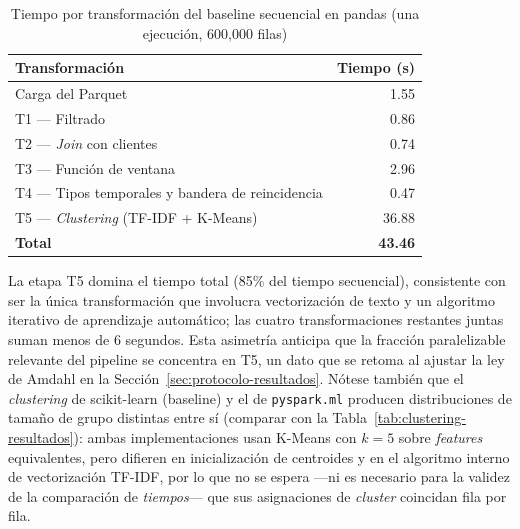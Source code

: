 \begin{table}[H]
\centering
\caption{Tiempo por transformación del baseline secuencial en pandas (una ejecución, 600{,}000 filas)}
\label{tab:baseline-tiempos}
\begin{tabular}{@{}lr@{}}
\toprule
\textbf{Transformación} & \textbf{Tiempo (s)} \\
\midrule
Carga del Parquet & 1.55 \\
T1 — Filtrado & 0.86 \\
T2 — \emph{Join} con clientes & 0.74 \\
T3 — Función de ventana & 2.96 \\
T4 — Tipos temporales y bandera de reincidencia & 0.47 \\
T5 — \emph{Clustering} (TF-IDF + K-Means) & 36.88 \\
\midrule
\textbf{Total} & \textbf{43.46} \\
\bottomrule
\end{tabular}
\end{table}

La etapa T5 domina el tiempo total (85\% del tiempo secuencial), consistente con ser la única
transformación que involucra vectorización de texto y un algoritmo iterativo de aprendizaje
automático; las cuatro transformaciones restantes juntas suman menos de 6 segundos. Esta asimetría
anticipa que la fracción paralelizable relevante del pipeline se concentra en T5, un dato que se
retoma al ajustar la ley de Amdahl en la Sección~\ref{sec:protocolo-resultados}. Nótese también que
el \emph{clustering} de scikit-learn (baseline) y el de \texttt{pyspark.ml} producen distribuciones
de tamaño de grupo distintas entre sí (comparar con la Tabla~\ref{tab:clustering-resultados}):
ambas implementaciones usan K-Means con $k=5$ sobre \emph{features} equivalentes, pero difieren en
inicialización de centroides y en el algoritmo interno de vectorización TF-IDF, por lo que no se
espera —ni es necesario para la validez de la comparación de \emph{tiempos}— que sus asignaciones
de \emph{cluster} coincidan fila por fila.
